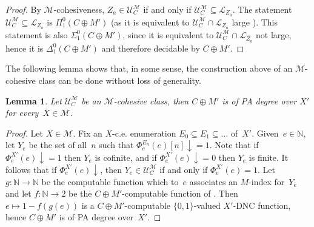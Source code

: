 \documentclass{article}
\def\NN{\mathbb{N}}
\def\U{\mathcal{U}}
\def\M{\mathcal{M}}
\renewcommand{\L}[0]{\mathcal{L}}
\newcommand{\converge}{\!\!\downarrow}
\newcommand{\finsub}{\subseteq_{\mathtt{fin}}}
\numberwithin{theorem}{section}
\newtheorem{lemma}[theorem]{Lemma}
\theoremstyle{definition}
\begin{document}
\begin{proof}
By $\M$-cohesiveness, $Z_a \in \U_C^{\M}$ if and only if $\U_C^\M \subseteq \L_{Z_a}$. The statement $\U_C^\M \subseteq \L_{Z_a}$ is $\Pi^0_1(C \oplus M')$ (as it is equivalent to $\U_C^\M \cap \L_{Z_a}$ large%
). This statement is also $\Sigma^0_1(C \oplus M')$, since it is equivalent to $\U_C^\M \cap \L_{\overline{Z_a}}$ not large, hence it is $\Delta^0_1(C \oplus M')$ and therefore decidable by $C \oplus M'$.
\end{proof}

The following lemma shows that, in some sense, the construction above of an $\M$-cohesive class can be done without loss of generality.

\begin{lemma}
    Let $\U_C^\M$ be an $\M$-cohesive class, then $C \oplus M'$ is of PA degree over $X'$ for every~$X \in \M$.
\end{lemma}

\begin{proof}
    Let $X \in \M$. Fix an $X$-c.e. enumeration $E_0 \subseteq E_1 \subseteq \dots$ of~$X'$.
    Given~$e \in \NN$, let $Y_e$ be the set of all~$n$ such that $\Phi_e^{E_n}(e)[n]\converge = 1$. Note that if~$\Phi_e^{X'}(e)\converge = 1$ then $Y_e$ is cofinite, and if $\Phi_e^{X'}(e)\converge = 0$ then $Y_e$ is finite. It follows that if $\Phi_e^{X'}(e)\converge$, then $Y_e \in \U_C^\M$ if and only if $\Phi_e^{X'}(e) = 1$. Let $g : \NN \to \NN$ be the computable function which to~$e$ associates an $M$-index for~$Y_e$ and let $f : \NN \to 2$ be the $C \oplus M'$-computable function of . Then $e \mapsto 1-f(g(e))$ is a  $C \oplus M'$-computable $\{0,1\}$-valued $X'$-DNC function, hence $C \oplus M'$ is of PA degree over~$X'$.
\end{proof}
\end{document}
